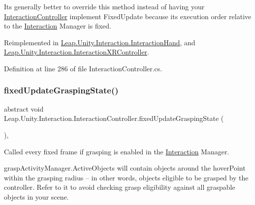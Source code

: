 It\textquotesingle{}s generally better to override this method instead of having your \mbox{\hyperlink{class_leap_1_1_unity_1_1_interaction_1_1_interaction_controller}{Interaction\+Controller}} implement Fixed\+Update because its execution order relative to the \mbox{\hyperlink{namespace_leap_1_1_unity_1_1_interaction}{Interaction}} Manager is fixed. 

Reimplemented in \mbox{\hyperlink{class_leap_1_1_unity_1_1_interaction_1_1_interaction_hand_ae6c2849268e677588ab571707d5aec5b}{Leap.\+Unity.\+Interaction.\+Interaction\+Hand}}, and \mbox{\hyperlink{class_leap_1_1_unity_1_1_interaction_1_1_interaction_x_r_controller_aa7e13f419009b2f0fd02018cc96f81b4}{Leap.\+Unity.\+Interaction.\+Interaction\+X\+R\+Controller}}.



Definition at line 286 of file Interaction\+Controller.\+cs.

\mbox{\label{class_leap_1_1_unity_1_1_interaction_1_1_interaction_controller_a5d182056bac8aea2d0ec005e35f768ca}} 
\subsubsection{\texorpdfstring{fixedUpdateGraspingState()}{fixedUpdateGraspingState()}}
{\footnotesize\ttfamily abstract void Leap.\+Unity.\+Interaction.\+Interaction\+Controller.\+fixed\+Update\+Grasping\+State (\begin{DoxyParamCaption}{ }\end{DoxyParamCaption})\hspace{0.3cm}{\ttfamily [protected]}, {}}



Called every fixed frame if grasping is enabled in the \mbox{\hyperlink{namespace_leap_1_1_unity_1_1_interaction}{Interaction}} Manager. 

grasp\+Activity\+Manager.\+Active\+Objects will contain objects around the hover\+Point within the grasping radius -- in other words, objects eligible to be grasped by the controller. Refer to it to avoid checking grasp eligibility against all graspable objects in your scene. 

